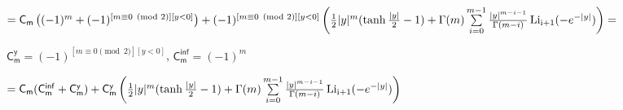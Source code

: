 \documentclass[a4paper,12pt]{article}
\begin{document}
\begin{center}
    $= \mathsf{C_m} \left((-1)^m + (-1)^{[m \equiv 0 \pmod{2}][y < 0]}\right)  + (-1)^{[m \equiv 0 \pmod{2}][y < 0]} \left({1\over{2}}|y|^m (\operatorname{tanh}{|y|\over{2}} - 1) + \Gamma(m)\sum\limits_{i = 0}^{m - 1} {|y|^{m - i - 1}\over{\Gamma(m - i)}} \operatorname{Li_{i + 1}}(-e^{-|y|})\right) =$
\end{center}

 $\mathsf{C_m^{y}} = (-1)^{[m \equiv 0 \pmod{2}][y < 0]}$, $\mathsf{C_m^{inf}} = (-1)^m$

\begin{center}
    $= \mathsf{C_m} (\mathsf{C_m^{inf}}+ \mathsf{C_m^{y}})  + \mathsf{C_m^{y}} \left({1\over{2}}|y|^m (\operatorname{tanh}{|y|\over{2}} - 1) + \Gamma(m)\sum\limits_{i = 0}^{m - 1} {|y|^{m - i - 1}\over{\Gamma(m - i)}} \operatorname{Li_{i + 1}}(-e^{-|y|})\right)$
\end{center}

\begin{center}
    
\end{center}

\begin{center}
    
\end{center}
\end{document}
